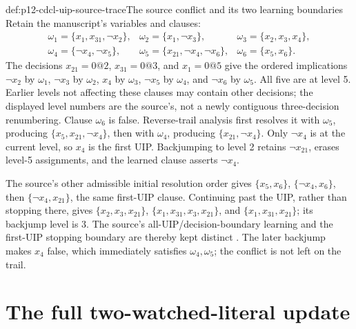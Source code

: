 \begin{hbexample}{def:p12-cdcl-uip-source-trace}{The source conflict and its two learning boundaries}
Retain the manuscript's variables and clauses:
\[
\begin{array}{lll}
 \omega_1=\{x_1,x_{31},\neg x_2\},&
 \omega_2=\{x_1,\neg x_3\},&
 \omega_3=\{x_2,x_3,x_4\},\\
 \omega_4=\{\neg x_4,\neg x_5\},&
 \omega_5=\{x_{21},\neg x_4,\neg x_6\},&
 \omega_6=\{x_5,x_6\}.
\end{array}
\]
The decisions \(x_{21}=0@2\), \(x_{31}=0@3\), and \(x_1=0@5\)
give the ordered implications \(\neg x_2\) by \(\omega_1\),
\(\neg x_3\) by \(\omega_2\), \(x_4\) by \(\omega_3\),
\(\neg x_5\) by \(\omega_4\), and \(\neg x_6\) by
\(\omega_5\).  All five are at level 5.  Earlier levels not affecting
these clauses may contain other decisions; the displayed level numbers are
the source's, not a newly contiguous three-decision renumbering.
Clause \(\omega_6\) is false.  Reverse-trail analysis first resolves it
with \(\omega_5\), producing \(\{x_5,x_{21},\neg x_4\}\), then
with \(\omega_4\), producing \(\{x_{21},\neg x_4\}\).
Only \(\neg x_4\) is at the current level, so \(x_4\) is the first UIP.
Backjumping to level 2 retains \(\neg x_{21}\), erases level-5 assignments,
and the learned clause asserts \(\neg x_4\).

The source's other admissible initial resolution order gives
\(\{x_5,x_6\}\), \(\{\neg x_4,x_6\}\), then
\(\{\neg x_4,x_{21}\}\), the same first-UIP clause.  Continuing
past the UIP, rather than stopping there, gives
\(\{x_2,x_3,x_{21}\}\), \(\{x_1,x_{31},x_3,x_{21}\}\), and
\(\{x_1,x_{31},x_{21}\}\); its backjump level is 3.
The source's all-UIP/decision-boundary learning and the first-UIP stopping
boundary are thereby kept distinct
\cite[Examples~4.2.4, 4.4.1--4.4.3; Tables~4.1--4.2]{MarquesSilvaLynceMalik2008CDCLManuscript}.
The later backjump makes \(x_4\) false, which immediately satisfies
\(\omega_4,\omega_5\); the conflict is not left on the trail.
\end{hbexample}

\section{The full two-watched-literal update}

